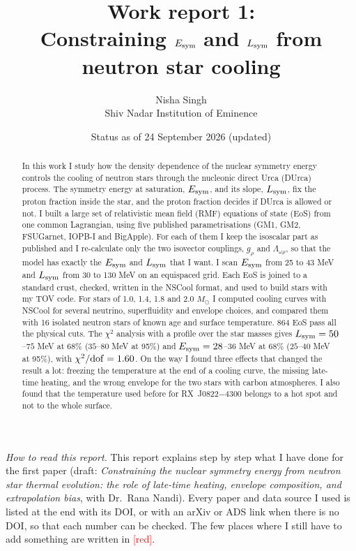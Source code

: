 \documentclass[11pt,a4paper]{article}
\title{Work report 1:\\ Constraining $\Esym$ and $\Lsym$ from neutron star cooling}
\author{Nisha Singh\\ Shiv Nadar Institution of Eminence}
\date{Status as of 24 September 2026 (updated)}
\newcommand{\fillin}[1]{\textcolor{red}{[#1]}}
\newcommand{\Esym}{E_{\rm sym}}
\newcommand{\Lsym}{L_{\rm sym}}
\newcommand{\Msun}{M_\odot}
\begin{document}
\sloppy
\maketitle

\noindent\textit{How to read this report.} This report explains step by step what I have done for the first paper (draft: \emph{Constraining the nuclear symmetry energy from neutron star thermal evolution: the role of late-time heating, envelope composition, and extrapolation bias}, with Dr.~Rana Nandi). Every paper and data source I used is listed at the end with its DOI, or with an arXiv or ADS link when there is no DOI, so that each number can be checked. The few places where I still have to add something are written in \fillin{red}.

\begin{abstract}
In this work I study how the density dependence of the nuclear symmetry energy controls the cooling of neutron stars through the nucleonic direct Urca (DUrca) process. The symmetry energy at saturation, $\Esym$, and its slope, $\Lsym$, fix the proton fraction inside the star, and the proton fraction decides if DUrca is allowed or not. I built a large set of relativistic mean field (RMF) equations of state (EoS) from one common Lagrangian, using five published parametrisations (GM1, GM2, FSUGarnet, IOPB-I and BigApple). For each of them I keep the isoscalar part as published and I re-calculate only the two isovector couplings, $g_\rho$ and $\Lambda_{\omega\rho}$, so that the model has exactly the $\Esym$ and $\Lsym$ that I want. I scan $\Esym$ from 25 to 43 MeV and $\Lsym$ from 30 to 130 MeV on an equispaced grid. Each EoS is joined to a standard crust, checked, written in the NSCool format, and used to build stars with my TOV code. For stars of 1.0, 1.4, 1.8 and 2.0 $\Msun$ I computed cooling curves with NSCool for several neutrino, superfluidity and envelope choices, and compared them with 16 isolated neutron stars of known age and surface temperature. 864 EoS pass all the physical cuts. The $\chi^2$ analysis with a profile over the star masses gives $\Lsym = 50$--$75$ MeV at 68\% ($35$--$80$ MeV at 95\%) and $\Esym = 28$--$36$ MeV at 68\% ($25$--$40$ MeV at 95\%), with $\chi^2/{\rm dof}=1.60$. On the way I found three effects that changed the result a lot: freezing the temperature at the end of a cooling curve, the missing late-time heating, and the wrong envelope for the two stars with carbon atmospheres. I also found that the temperature used before for RX~J0822$-$4300 belongs to a hot spot and not to the whole surface.
\end{abstract}
\end{document}
